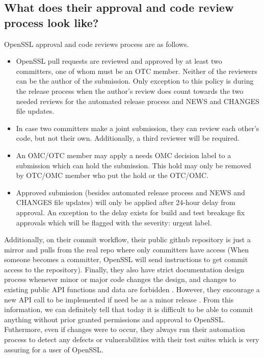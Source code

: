 \documentclass[conference]{IEEEtran}
\begin{document}
\subsection{What does their approval and code review process look like?}
    OpenSSL approval and code reviews process are as follows.

    \begin{itemize}
        \item OpenSSL pull requests are reviewed and approved by at
          least two committers, one of whom must be an OTC
          member. Neither of the reviewers can be the author of the
          submission\cite{7}.  Only exception to this policy is during
          the release process when the author's review does count
          towards the two needed reviews for the automated release
          process and NEWS and CHANGES file updates\cite{7}.

        \item In case two committers make a joint submission, they can
          review each other's code, but not their own. Additionally, a
          third reviewer will be required\cite{7}.

        \item An OMC/OTC member may apply a needs OMC decision label
          to a submission which can hold the submission. This hold may
          only be removed by OTC/OMC member who put the hold or the
          OTC/OMC\cite{7}.

        \item Approved submission (besides automated release process
          and NEWS and CHANGES file updates) will only be applied
          after 24-hour delay from approval. An exception to the delay
          exists for build and test breakage fix approvals which will
          be flagged with the severity: urgent label\cite{7}.
    \end{itemize}

    Additionally, on their commit workflow, their public github
    repository is just a mirror and pulls from the real repo where
    only committers have access\cite{7} (When someone becomes a
    committer, OpenSSL will send instructions to get commit access to
    the repository\cite{7}).  Finally, they also have strict
    documentation design process whenever minor or major code changes
    the design, and changes to existing public API functions and data
    are forbidden \cite{9}. However, they encourage a new API call to
    be implemented if need be as a minor release \cite{9}. From this
    information, we can definitely tell that today it is difficult to
    be able to commit anything without prior granted permissions and
    approval to OpenSSL. Futhermore, even if changes were to occur,
    they always run their automation process to detect any defects or
    vulnerabilities with their test suites which is very assuring for
    a user of OpenSSL.
    \\
\end{document}
